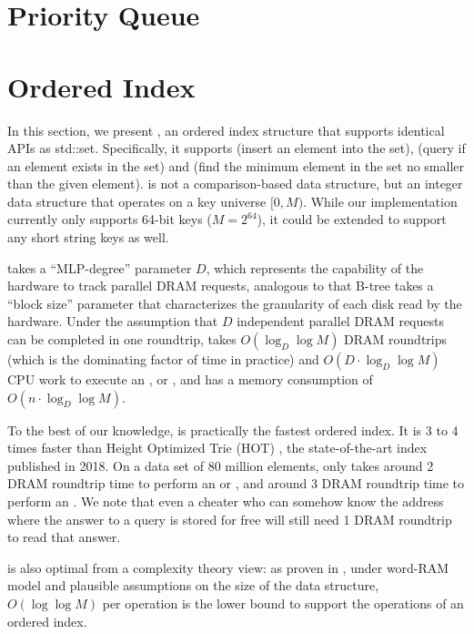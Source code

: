 \documentclass[11pt, usletter]{article}
\begin{document}
\section{Priority Queue} \label{priorityqueue}

\section{Ordered Index} \label{orderedindex}

In this section, we present \MlpIndex, an ordered index structure that supports identical APIs as std::set.
Specifically, it supports \insertion (insert an element into the set), \lookup (query if an element exists in the set) 
and \lowerbound (find the minimum element in the set no smaller than the given element).
\MlpIndex is not a comparison-based data structure, but an integer data structure that operates on a key universe $[0,M)$.
While our implementation currently only supports 64-bit keys ($M=2^{64}$), it could be extended to support any short string keys as well.

\MlpIndex takes a ``MLP-degree'' parameter $D$, 
which represents the capability of the hardware to track parallel DRAM requests, 
analogous to that B-tree takes a ``block size'' parameter that characterizes the granularity of each disk read by the hardware.
Under the assumption that $D$ independent parallel DRAM requests can be completed in one roundtrip,
\MlpIndex takes $O(\log_D\log M)$ DRAM roundtrips (which is the dominating factor of time in practice) 
and $O(D\cdot\log_D\log M)$ CPU work to execute an \insertion, \lookup or \lowerbound,
and has a memory consumption of $O(n\cdot \log_D\log M)$.

To the best of our knowledge, \MlpIndex is practically the fastest ordered index. 
It is 3 to 4 times faster than Height Optimized Trie (HOT) \cite{hot_sigmod18}, 
the state-of-the-art index published in 2018. 
On a data set of 80 million elements, \MlpIndex only takes around 2 DRAM roundtrip time to perform 
an \insertion or \lookup, and around 3 DRAM roundtrip time to perform an \lowerbound.
We note that even a cheater who can somehow know the address where the answer to a query is stored for free 
will still need 1 DRAM roundtrip to read that answer. 

\MlpIndex is also optimal from a complexity theory view: as proven in \cite{ajtai88comb-lowerbound}, 
under word-RAM model and plausible assumptions on the size of the data structure, 
$O(\log \log M)$ per operation is the lower bound to support the operations of an ordered index. 
\end{document}
